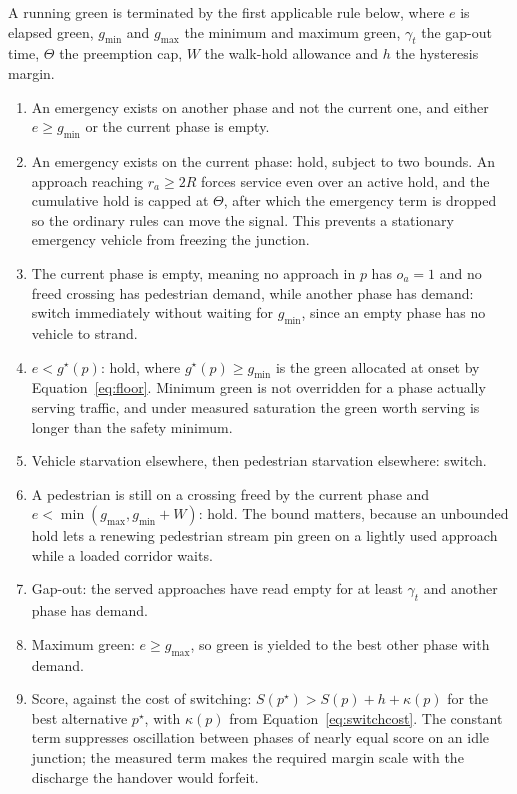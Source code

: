 \documentclass[journal]{IEEEtran}
\begin{document}
A running green is terminated by the first applicable rule below, where $e$ is elapsed green,
$g_{\min}$ and $g_{\max}$ the minimum and maximum green, $\gamma_t$ the gap-out time, $\Theta$ the
preemption cap, $W$ the walk-hold allowance and $h$ the hysteresis margin.

\begin{enumerate}
\item An emergency exists on another phase and not the current one, and either $e \geq g_{\min}$ or
the current phase is empty.
\item An emergency exists on the current phase: hold, subject to two bounds. An approach reaching
$r_a \geq 2R$ forces service even over an active hold, and the cumulative hold is capped at $\Theta$,
after which the emergency term is dropped so the ordinary rules can move the signal. This prevents a
stationary emergency vehicle from freezing the junction.
\item The current phase is empty, meaning no approach in $p$ has $o_a = 1$ and no freed crossing has
pedestrian demand, while another phase has demand: switch immediately without waiting for $g_{\min}$,
since an empty phase has no vehicle to strand.
\item $e < g^\star(p)$: hold, where $g^\star(p) \geq g_{\min}$ is the green allocated at onset by
Equation~\ref{eq:floor}. Minimum green is not overridden for a phase actually serving traffic, and
under measured saturation the green worth serving is longer than the safety minimum.
\item Vehicle starvation elsewhere, then pedestrian starvation elsewhere: switch.
\item A pedestrian is still on a crossing freed by the current phase and
$e < \min(g_{\max}, g_{\min} + W)$: hold. The bound matters, because an unbounded hold lets a renewing
pedestrian stream pin green on a lightly used approach while a loaded corridor waits.
\item Gap-out: the served approaches have read empty for at least $\gamma_t$ and another phase has
demand.
\item Maximum green: $e \geq g_{\max}$, so green is yielded to the best other phase with demand.
\item Score, against the cost of switching: $S(p^\star) > S(p) + h + \kappa(p)$ for the best
alternative $p^\star$, with $\kappa(p)$ from Equation~\ref{eq:switchcost}. The constant term
suppresses oscillation between phases of nearly equal score on an idle junction; the measured term
makes the required margin scale with the discharge the handover would forfeit.
\end{enumerate}
\end{document}
